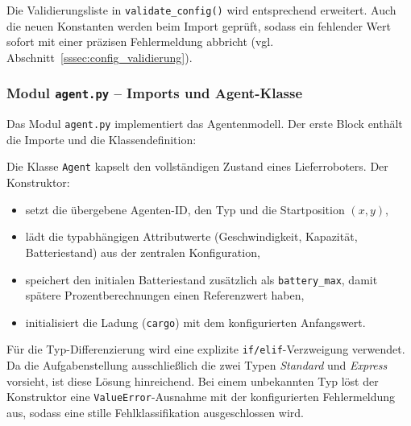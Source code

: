 Die Validierungsliste in \texttt{validate\_config()} wird entsprechend erweitert. Auch die neuen Konstanten werden beim Import geprüft, sodass ein fehlender Wert sofort mit einer präzisen Fehlermeldung abbricht (vgl. Abschnitt~\ref{sssec:config_validierung}).


\subsubsection{Modul \texttt{agent.py} – Imports und Agent-Klasse}

Das Modul \texttt{agent.py} implementiert das Agentenmodell. Der erste Block enthält die Importe und die Klassendefinition:



Die Klasse \texttt{Agent} kapselt den vollständigen Zustand eines Lieferroboters. Der Konstruktor:
\begin{itemize}
    \item setzt die übergebene Agenten-ID, den Typ und die Startposition \((x, y)\),
    \item lädt die typabhängigen Attributwerte (Geschwindigkeit, Kapazität, Batteriestand) aus der zentralen Konfiguration,
    \item speichert den initialen Batteriestand zusätzlich als \texttt{battery\_max}, damit spätere Prozentberechnungen einen Referenzwert haben,
    \item initialisiert die Ladung (\texttt{cargo}) mit dem konfigurierten Anfangswert.
\end{itemize}

Für die Typ-Differenzierung wird eine explizite \texttt{if/elif}-Verzweigung verwendet. Da die Aufgabenstellung ausschließlich die zwei Typen \textit{Standard} und \textit{Express} vorsieht, ist diese Lösung hinreichend. Bei einem unbekannten Typ löst der Konstruktor eine \texttt{ValueError}-Ausnahme mit der konfigurierten Fehlermeldung aus, sodass eine stille Fehlklassifikation ausgeschlossen wird.

